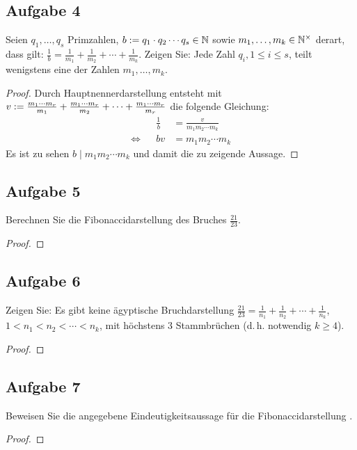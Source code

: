 \subsection{Aufgabe 4}
Seien $q_1,\dotsc,q_s$ Primzahlen, $b :={} q_1 \cdot q_2 \dotsm q_s \in \mathbb{N}{}$
sowie $m_1,\dotsc,m_k \in \mathbb{N}^\times{}$ derart, dass gilt:
$\frac{1}{b} = \frac{1}{m_1} + \frac{1}{m_2} + \dotsb + \frac{1}{m_k}$.
Zeigen Sie: Jede Zahl $q_i, 1 \leq i \leq s$, teilt wenigstens eine der Zahlen $m_1,\dotsc,m_k$.
\begin{proof}
  Durch Hauptnennerdarstellung entsteht mit $v := \frac{m_1 \dotsm m_r}{m_1} +
    \frac{m_1 \dotsm m_r}{m_2} + \dotsb + \frac{m_1 \dotsm m_r}{m_r}$
  die folgende Gleichung:
  \begin{equation*}
    \begin{aligned}
           &  & \frac{1}{b} & = \frac{v}{m_1m_2 \dotsm m_k} \\
      \iff &  & bv          & = m_1m_2 \dotsm m_k
    \end{aligned}
  \end{equation*}
  Es ist zu sehen $b \mid m_1m_2 \dotsm m_k$ und damit die zu zeigende Aussage.
\end{proof}

\subsection{Aufgabe 5}
Berechnen Sie die Fibonaccidarstellung des Bruches $\frac{21}{23}$.
\begin{proof}
\end{proof}

\subsection{Aufgabe 6}
Zeigen Sie: Es gibt keine ägyptische Bruchdarstellung
$\frac{21}{23} = \frac{1}{n_1} + \frac{1}{n_2} + \dotsb + \frac{1}{n_k}$,
$1 < n_1 < n_2 < \dotsb < n_k$, mit höchstens 3 Stammbrüchen
(d.\,h. notwendig $k \geq 4$).
\begin{proof}
\end{proof}

\subsection{Aufgabe 7}
Beweisen Sie die angegebene Eindeutigkeitsaussage für die Fibonaccidarstellung
\parencite[53]{book:zahlentheorie}.
\begin{proof}
\end{proof}
